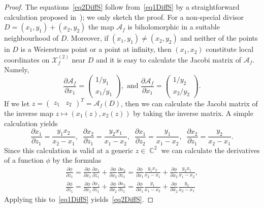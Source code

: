 \documentclass{amsart}
\numberwithin{equation}{section}
\theoremstyle{definition}
\theoremstyle{remark}
\DeclareMathOperator{\CC}{\mathbb C}
\begin{document}
\begin{proof}
		The equations~\eqref{eq2DiffS} follow from~\eqref{eq1DiffS} by a straightforward calculation proposed in~\cite{baker}); we only sketch the proof. For a non-special divisor $D = (x_1,y_1) + (x_2,y_2)$ the map $\mathscr A_f$ is biholomorphic in a suitable neighbourhood of $D$. Moreover, if $(x_1,y_1) \ne (x_2,y_2)$ and neither of the points in $D$ is a Weierstrass point or a point at infinity, then $(x_1,x_2)$ constitute local coordinates on $\mathcal X_f^{(2)}$ near $D$ and it is easy to calculate the Jacobi matrix of $\mathscr A_f$. Namely,
		\[
		\frac{\partial \mathscr A_f}{\partial x_1} = \begin{pmatrix}
			1/y_1 \\ x_1/y_1
		\end{pmatrix},\text{ and }\frac{\partial \mathscr A_f}{\partial x_1} = \begin{pmatrix}
			1/y_2 \\ x_2/y_2
		\end{pmatrix}.
		\]
		If we let $z = \begin{pmatrix} z_1 & z_2 \end{pmatrix}^T = \mathscr A_f(D)$, then we can calculate the Jacobi matrix of the inverse map $z \mapsto (x_1(z),x_2(z))$ by taking the inverse matrix. A simple calculation yields
		\[
		\frac{\partial x_1}{\partial z_1} = \frac{y_1x_2}{x_2 - x_1},\;\;\frac{\partial x_2}{\partial z_1} = \frac{y_2x_1}{x_1 - x_2},\;\; \frac{\partial x_1}{\partial z_2} = \frac{y_1}{x_1 - x_2},\;\;\frac{\partial x_2}{\partial z_1} = \frac{y_2}{x_2 - x_1}.
		\]
		Since this calculation is valid at a generic $z \in \CC^2$ we can calculate the derivatives of a function $\phi$ by the formulas
		\[
		\begin{gathered}
			\frac{\partial \phi}{\partial z_1} = \frac{\partial \phi}{\partial x_1}\frac{\partial x_1}{\partial z_1} + \frac{\partial \phi}{\partial x_2}\frac{\partial x_2}{\partial z_1} = \frac{\partial \phi}{\partial x_1}\frac{y_1x_2}{x_2 - x_1} + \frac{\partial \phi}{\partial x_2}\frac{y_2x_1}{x_1 - x_2}, \\ \frac{\partial \phi}{\partial z_1} = \frac{\partial \phi}{\partial x_1}\frac{\partial x_1}{\partial z_1} + \frac{\partial \phi}{\partial x_2}\frac{\partial x_2}{\partial z_1} = \frac{\partial \phi}{\partial x_1}\frac{y_1}{x_1 - x_2} + \frac{\partial \phi}{\partial x_2}\frac{y_2}{x_2 - x_1}
		\end{gathered}
		\]
		Applying this to~\eqref{eq1DiffS} yields~\eqref{eq2DiffS}.
	\end{proof}
\end{document}

